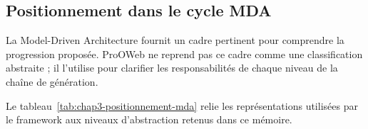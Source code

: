 \subsection{Positionnement dans le cycle MDA}

La Model-Driven Architecture fournit un cadre pertinent pour comprendre la progression proposée. ProOWeb ne reprend pas ce cadre comme une classification abstraite ; il l'utilise pour clarifier les responsabilités de chaque niveau de la chaîne de génération.

Le tableau~\ref{tab:chap3-positionnement-mda} relie les représentations utilisées
par le framework aux niveaux d'abstraction retenus dans ce mémoire.




